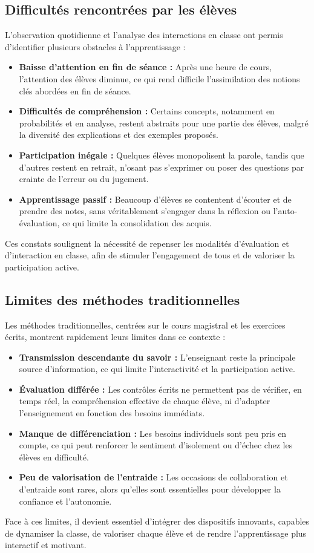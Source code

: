 \documentclass[a4paper,11pt]{report}
\begin{document}
\subsection{Difficultés rencontrées par les élèves}
L'observation quotidienne et l'analyse des interactions en classe ont permis d'identifier plusieurs obstacles à l'apprentissage :
\begin{itemize}
    \item \textbf{Baisse d'attention en fin de séance :} Après une heure de cours, l'attention des élèves diminue, ce qui rend difficile l'assimilation des notions clés abordées en fin de séance.
    \item \textbf{Difficultés de compréhension :} Certains concepts, notamment en probabilités et en analyse, restent abstraits pour une partie des élèves, malgré la diversité des explications et des exemples proposés.
    \item \textbf{Participation inégale :} Quelques élèves monopolisent la parole, tandis que d'autres restent en retrait, n'osant pas s'exprimer ou poser des questions par crainte de l'erreur ou du jugement.
    \item \textbf{Apprentissage passif :} Beaucoup d'élèves se contentent d'écouter et de prendre des notes, sans véritablement s'engager dans la réflexion ou l'auto-évaluation, ce qui limite la consolidation des acquis.
\end{itemize}
Ces constats soulignent la nécessité de repenser les modalités d'évaluation et d'interaction en classe, afin de stimuler l'engagement de tous et de valoriser la participation active.

\subsection{Limites des méthodes traditionnelles}
Les méthodes traditionnelles, centrées sur le cours magistral et les exercices écrits, montrent rapidement leurs limites dans ce contexte :
\begin{itemize}
    \item \textbf{Transmission descendante du savoir :} L'enseignant reste la principale source d'information, ce qui limite l'interactivité et la participation active.
    \item \textbf{Évaluation différée :} Les contrôles écrits ne permettent pas de vérifier, en temps réel, la compréhension effective de chaque élève, ni d'adapter l'enseignement en fonction des besoins immédiats.
    \item \textbf{Manque de différenciation :} Les besoins individuels sont peu pris en compte, ce qui peut renforcer le sentiment d'isolement ou d'échec chez les élèves en difficulté.
    \item \textbf{Peu de valorisation de l'entraide :} Les occasions de collaboration et d'entraide sont rares, alors qu'elles sont essentielles pour développer la confiance et l'autonomie.
\end{itemize}
Face à ces limites, il devient essentiel d'intégrer des dispositifs innovants, capables de dynamiser la classe, de valoriser chaque élève et de rendre l'apprentissage plus interactif et motivant.
\end{document}
